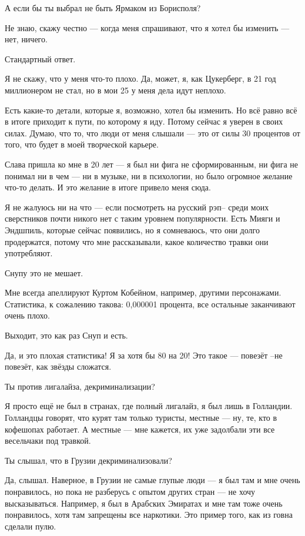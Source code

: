 А если бы ты выбрал не быть Ярмаком из Борисполя?

Не знаю, скажу честно --- когда меня спрашивают, что я хотел бы изменить --- нет,
ничего.

Стандартный ответ.

Я не скажу, что у меня что-то плохо. Да, может, я, как Цукерберг, в 21 год
миллионером не стал, но в мои 25 у меня дела идут неплохо.

Есть какие-то детали, которые я, возможно, хотел бы изменить. Но всё равно всё
в итоге приходит к пути, по которому я иду. Потому сейчас я уверен в своих
силах. Думаю, что то, что люди от меня слышали --- это от силы 30 процентов от
того, что будет в моей творческой карьере.

Слава пришла ко мне в 20 лет --- я был ни фига  не сформированным, ни фига не
понимал ни в чем --- ни в музыке, ни в психологии, но было огромное желание
что-то делать. И это желание в итоге привело меня сюда.

Я не жалуюсь ни на что --- если посмотреть на русский рэп– среди моих сверстников
почти никого нет с таким уровнем популярности. Есть Мияги и Эндшпиль, которые
сейчас появились, но я сомневаюсь, что они долго продержатся, потому что мне
рассказывали, какое количество травки они употребляют.

Снупу это не мешает.

Мне всегда апеллируют Куртом Кобейном, например, другими персонажами.
Статистика, к сожалению такова: 0,000001 процента, все остальные заканчивают
очень плохо.

Выходит, это как раз Снуп и есть.

Да, и это плохая статистика! Я за хотя бы 80 на 20! Это такое --- повезёт –не
повезёт, как звёзды сложатся.

Ты против лигалайза, декриминализации?

Я просто ещё не был в странах, где полный лигалайз, я был лишь в Голландии.
Голландцы говорят, что курят там только туристы, местные --- ну, те, кто в
кофешопах работает. А местные --- мне кажется, их уже задолбали эти все
весельчаки под травкой.

Ты слышал, что в Грузии декриминализовали?

Да, слышал. Наверное, в Грузии не самые глупые люди --- я был там и мне очень
понравилось, но пока не разберусь с опытом других стран --- не хочу
высказываться. Например, я был в Арабских Эмиратах и мне там тоже очень
понравилось, хотя там запрещены все наркотики. Это пример того, как из говна
сделали пулю.

